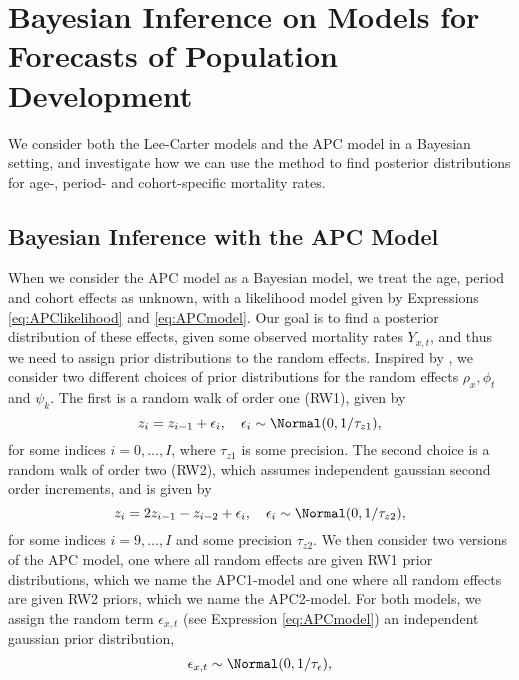 \newpage
\section{Bayesian Inference on Models for Forecasts of Population Development}
\label{sec:BayesianInference}
We consider both the Lee-Carter models and the APC model in a Bayesian setting, and investigate how we can use the \inla method to find posterior distributions for age-, period- and cohort-specific mortality rates. 


\subsection{Bayesian Inference with the APC Model}
\label{sec:BayesianInferenceAPC}
When we consider the APC model as a Bayesian model, we treat the age, period and cohort effects as unknown, with a likelihood model given by Expressions \ref{eq:APClikelihood} and \ref{eq:APCmodel}. Our goal is to find a posterior distribution of these effects, given some observed mortality rates $Y_{x,t}$, and thus we need to assign prior distributions to the random effects. Inspired by \parencite{RieblerThesis2010}, we consider two different choices of prior distributions for the random effects $\rho_x, \phi_t$ and $\psi_k$. The first is a random walk of order one (RW1), given by
\begin{equation}
    z_i = z_{i-1} + \epsilon_i, \quad \epsilon_i \sim \Normal(0,1/\tau_{z1}),
    \label{eq:APCrw1}
\end{equation}
for some indices $i = 0,\ldots,I$, where $\tau_{z1}$ is some precision. The second choice is a random walk of order two (RW2), which assumes independent gaussian second order increments, and is given by
\begin{equation}
    z_i = 2z_{i-1} - z_{i-2} + \epsilon_i, \quad \epsilon_i \sim \Normal(0, 1/\tau_{z2}),
    \label{eq:APCrw2}
\end{equation}
for some indices $i = 9,\ldots,I$ and some precision $\tau_{z2}$. We then consider two versions of the APC model, one where all random effects are given RW1 prior distributions, which we name the APC1-model and one where all random effects are given RW2 priors, which we name the APC2-model. For both models, we assign the random term $\epsilon_{x,t}$ (see Expression \ref{eq:APCmodel}) an independent gaussian prior distribution,
\begin{equation}
    \epsilon_{x,t} \sim \Normal(0,1/\tau_\epsilon),
\end{equation}
